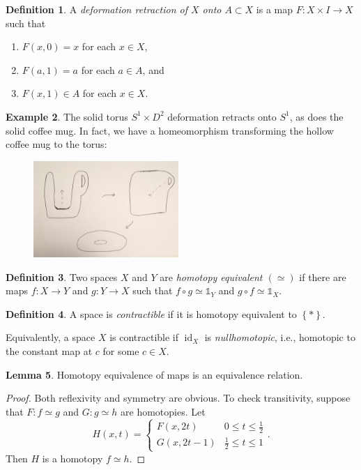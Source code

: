 \documentclass[10pt,letterpaper,cm]{nupset}
\theoremstyle{definition}
\newtheorem{definition}{Definition}[subsection]
\newtheorem{exmp}[definition]{Example}
\theoremstyle{theorem}
\newtheorem{lemma}[definition]{Lemma}
\theoremstyle{remark}
\newcommand{\1}{\mathbb{1}}
\newcommand{\0}{\vec 0}
\DeclareMathOperator{\id}{id}
\begin{document}
\begin{definition}
A \textit{deformation retraction of $X$ onto $A\subset X$} is a map $F: X \times I \to X$ such that 
\begin{enumerate}[label=(\roman*)]
\item $F(x, 0) = x$ for each $x\in X$, 
\item $F(a, 1) = a$ for each $a\in A$, and 
\item $F(x, 1) \in A$ for each $x\in X$.
\end{enumerate}
\end{definition}

\begin{exmp}
The solid torus $S^1 \times D^2$ deformation retracts onto $S^1$, as does the solid coffee mug. In fact, we have a homeomorphism transforming the hollow coffee mug to the torus:

\begin{figure}[H]
\centering
\includegraphics[width=55mm]{mug.jpg}
\end{figure}
\end{exmp}

\begin{definition}
Two spaces $X$ and $Y$ are \textit{homotopy equivalent $\left(\simeq\right)$} if there are maps $f: X\to Y$ and $g: Y \to X$ such that $f\circ g \simeq \mathbb{1}_Y$ and $g\circ f \simeq \mathbb{1}_X$.
\end{definition}

\begin{definition}
A space is \textit{contractible} if it is homotopy equivalent to $\left\{\ast \right\}$.
\end{definition}

Equivalently, a space $X$ is contractible if $\id_X$ is \textit{nullhomotopic}, i.e., homotopic to the constant map at $c$ for some $c\in X$.

\begin{lemma}
Homotopy equivalence of maps is an equivalence relation.
\end{lemma}
\begin{proof}
Both reflexivity and symmetry are obvious. To check transitivity, suppose that $F : f \simeq g$ and $G: g\simeq h$ are homotopies. Let $$H(x,t) = \begin{cases}
F(x, 2t) & 0 \leq t \leq \frac{1}{2}
\\ G(x, 2t-1) & \frac{1}{2} \leq t \leq 1
\end{cases}.$$ Then $H$ is a homotopy $f \simeq h$.
\end{proof}
\end{document}
